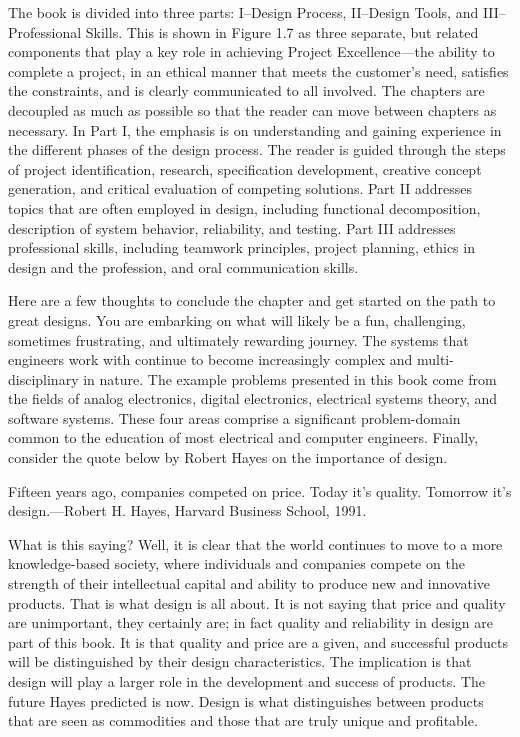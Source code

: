 The book is divided into three parts: I--Design Process, II--Design
Tools, and III--Professional Skills. This is shown in Figure 1.7 as
three separate, but related components that play a key role in achieving
Project Excellence---the ability to complete a project, in an ethical
manner that meets the customer's need, satisfies the constraints, and is
clearly communicated to all involved. The chapters are decoupled as much
as possible so that the reader can move between chapters as necessary.
In Part I, the emphasis is on understanding and gaining experience in
the different phases of the design process. The reader is guided through
the steps of project identification, research, specification
development, creative concept generation, and critical evaluation of
competing solutions. Part II addresses topics that are often employed in
design, including functional decomposition, description of system
behavior, reliability, and testing. Part III addresses professional
skills, including teamwork principles, project planning, ethics in
design and the profession, and oral communication skills.

Here are a few thoughts to conclude the chapter and get started on the
path to great designs. You are embarking on what will likely be a fun,
challenging, sometimes frustrating, and ultimately rewarding journey.
The systems that engineers work with continue to become increasingly
complex and multi-disciplinary in nature. The example problems presented
in this book come from the fields of analog electronics, digital
electronics, electrical systems theory, and software systems. These four
areas comprise a significant problem-domain common to the education of
most electrical and computer engineers. Finally, consider the quote
below by Robert Hayes on the importance of design.

Fifteen years ago, companies competed on price. Today it's quality.
Tomorrow it's design.---Robert H. Hayes, Harvard Business School, 1991.

What is this saying? Well, it is clear that the world continues to move
to a more knowledge-based society, where individuals and companies
compete on the strength of their intellectual capital and ability to
produce new and innovative products. That is what design is all about.
It is not saying that price and quality are unimportant, they certainly
are; in fact quality and reliability in design are part of this book. It
is that quality and price are a given, and successful products will be
distinguished by their design characteristics. The implication is that
design will play a larger role in the development and success of
products. The future Hayes predicted is now. Design is what
distinguishes between products that are seen as commodities and those
that are truly unique and profitable.

